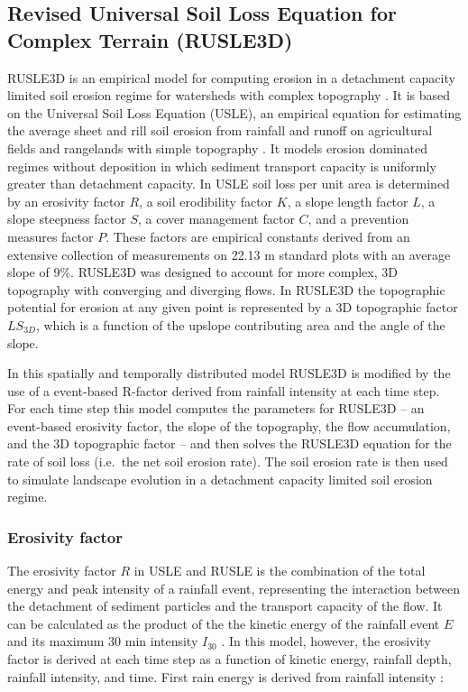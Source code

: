 \documentclass[gmd, manuscript]{copernicus}
\begin{document}
\subsection{Revised Universal Soil Loss Equation for Complex Terrain (RUSLE3D)}
\label{rusle_model}
RUSLE3D
is an empirical model for computing erosion 
in a detachment capacity limited soil erosion regime
for watersheds with complex topography \citep{Mitasova1996}. 
It is based on 
the Universal Soil Loss Equation (USLE),
an empirical equation for estimating the average
sheet and rill soil erosion from rainfall and runoff
on agricultural fields and rangelands with simple topography 
\citep{Wischmeier1978}. 
It models erosion dominated regimes without deposition
in which sediment transport capacity is 
uniformly greater than detachment capacity.
In USLE soil loss per unit area is determined by 
an erosivity factor $R$,
a soil erodibility factor $K$, 
a slope length factor $L$,
a slope steepness factor $S$,
a cover management factor $C$,
and a prevention measures factor $P$.
These factors are empirical constants derived 
from an extensive collection of measurements 
on 22.13 \unit{m} standard plots with an average slope of 9$\%$.  
RUSLE3D was designed to account for more complex, 3D topography 
with converging and diverging flows. 
In RUSLE3D the topographic potential for erosion at any given point 
is represented by a 3D topographic factor $LS_{3D}$,
which is a function of the upslope contributing area 
and the angle of the slope. 

In this spatially and temporally distributed model 
RUSLE3D is modified by the use of a 
event-based R-factor derived from rainfall intensity at each time step.
For each time step this model computes the parameters for RUSLE3D -- 
an event-based erosivity factor,
the slope of the topography, the flow accumulation, and
the 3D topographic factor -- 
and then solves the RUSLE3D equation for the rate of soil loss 
(i.e.~the net soil erosion rate). 
The soil erosion rate is then used to simulate landscape evolution 
in a detachment capacity limited soil erosion regime.


\subsubsection{Erosivity factor}

The erosivity factor $R$ in USLE and RUSLE 
is the combination of the total energy 
and peak intensity of a rainfall event,
representing the interaction 
between the detachment of sediment particles
and the transport capacity of the flow. 
It can be calculated as the product of the 
the kinetic energy of the rainfall event $E$
and its maximum 30 \unit{min} intensity $I_{30}$
\citep{Brown1987,Renard1997,Panagos2015,Panagos2017}.
In this model, however, the erosivity factor
is derived at each time step as a function of
kinetic energy, rainfall depth, rainfall intensity, and time.
First rain energy is derived from rainfall intensity \citep{Brown1987,Yin2017}:
\end{document}
